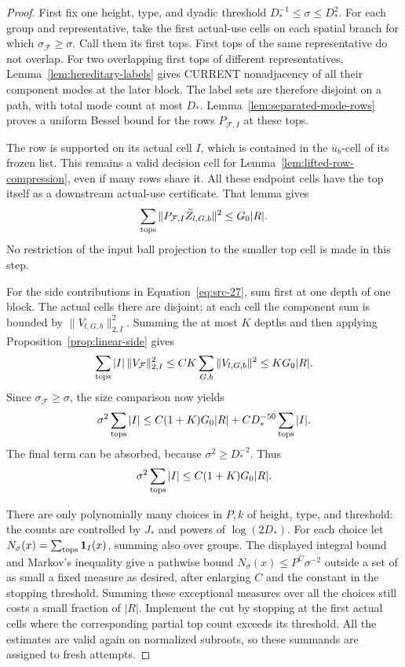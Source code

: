 \begin{proof}
First fix one height, type, and dyadic threshold
\(D_*^{-1}\le\sigma\le D_*^2\).
For each group and representative, take the first actual-use
cells on each spatial branch for which
\(\sigma_{\mathcal F}\ge\sigma\).  Call them its first tops.
First tops of the same representative do not overlap.
For two overlapping first tops of different representatives,
Lemma~\ref{lem:hereditary-labels} gives CURRENT nonadjacency of
all their component modes at the later block.
The label sets are therefore disjoint on a path, with total
mode count at most \(D_*\).
Lemma~\ref{lem:separated-mode-rows} proves a uniform Bessel bound
for the rows \(P_{\mathcal F,I}\) at these tops.

The row is supported on its actual cell \(I\), which is contained
in the \(u_b\)-cell of its frozen list.  This remains a valid
decision cell for Lemma~\ref{lem:lifted-row-compression}, even if
many rows share it.  All these endpoint cells have the top itself
as a downstream actual-use certificate.  That lemma gives
\[
 \sum_{\rm tops}
      \|P_{\mathcal F,I}\widetilde Z_{l,G,b}\|^2
          \le G_0|R|.
\]
No restriction of the input ball projection to the smaller top
cell is made in this step.

For the side contributions in Equation~\eqref{eq:src-27}, sum
first at one depth of one block.  The actual cells there are
disjoint; at each cell the component sum is bounded by
\(\|V_{l,G,b}\|_{2,I}^2\).  Summing the at most \(K\) depths and
then applying Proposition~\ref{prop:linear-side} gives
\[
 \sum_{\rm tops}|I|\,\|V_{\mathcal F}\|_{2,I}^2
       \le C K\sum_{G,b}\|V_{l,G,b}\|^2
       \le K G_0|R|.
\]
Since \(\sigma_{\mathcal F}\ge\sigma\), the size comparison now
yields
\[
 \sigma^2\sum_{\rm tops}|I|
       \le C(1+K)G_0|R|
              +C D_*^{-50}\sum_{\rm tops}|I|.
\]
The final term can be absorbed, because
\(\sigma^2\ge D_*^{-2}\).  Thus
\[
 \sigma^2\sum_{\rm tops}|I|
                 \le C(1+K)G_0|R|.
\]

There are only polynomially many choices in \(P,k\) of height,
type, and threshold: the counts are controlled by \(J_*\) and
powers of \(\log(2D_*)\).
For each choice let
\(N_\sigma(x)=\sum_{\rm tops}\mathbf 1_I(x)\), summing also over groups.
The displayed integral bound and Markov's inequality give a
pathwise bound
\(N_\sigma(x)\le P^C\sigma^{-2}\) outside a set of as small a
fixed measure as desired, after enlarging \(C\) and the constant
in the stopping threshold.  Summing these exceptional measures
over all the choices still costs a small fraction of \(|R|\).
Implement the cut by stopping at the first actual cells where
the corresponding partial top count exceeds its threshold.
All the estimates are valid again on normalized subroots, so
these summands are assigned to fresh attempts.


\end{proof}
